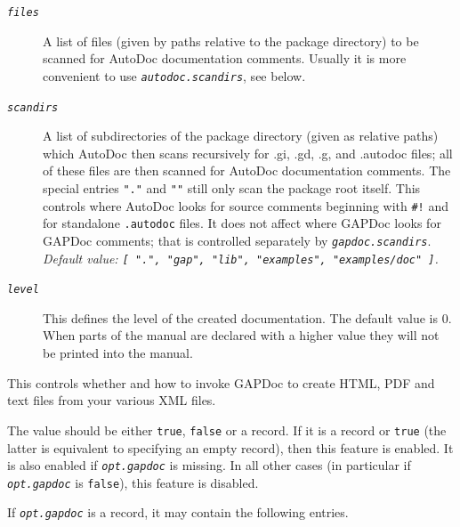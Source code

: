 \documentclass[a4paper,11pt]{report}
\begin{document}
{{{\begin{description}
\begin{description}
 
\begin{description}
\item[{\mbox{\texttt{\mdseries\slshape files}}}]  A list of files (given by paths relative to the package directory) to be
scanned for \textsf{AutoDoc} documentation comments. Usually it is more convenient to use \mbox{\texttt{\mdseries\slshape autodoc.scan{\textunderscore}dirs}}, see below. 
\item[{\mbox{\texttt{\mdseries\slshape scan{\textunderscore}dirs}}}]  A list of subdirectories of the package directory (given as relative paths)
which \textsf{AutoDoc} then scans recursively for .gi, .gd, .g, and .autodoc files; all of these
files are then scanned for \textsf{AutoDoc} documentation comments. The special entries \texttt{"."} and \texttt{""} still only scan the package root itself. This controls where \textsf{AutoDoc} looks for source comments beginning with \texttt{\#!} and for standalone \texttt{.autodoc} files. It does not affect where \textsf{GAPDoc} looks for GAPDoc comments; that is controlled separately by \mbox{\texttt{\mdseries\slshape gapdoc.scan{\textunderscore}dirs}}. \\
 \emph{Default value: \texttt{[ ".", "gap", "lib", "examples", "examples/doc" ]}.} 
\item[{\mbox{\texttt{\mdseries\slshape level}}}]  This defines the level of the created documentation. The default value is 0.
When parts of the manual are declared with a higher value they will not be
printed into the manual. 
\end{description}
 
\item[{\mbox{\texttt{\mdseries\slshape gapdoc}}}]  This controls whether and how to invoke \textsf{GAPDoc} to create HTML, PDF and text files from your various XML files. 

 The value should be either \texttt{true}, \texttt{false} or a record. If it is a record or \texttt{true} (the latter is equivalent to specifying an empty record), then this feature is
enabled. It is also enabled if \mbox{\texttt{\mdseries\slshape opt.gapdoc}} is missing. In all other cases (in particular if \mbox{\texttt{\mdseries\slshape opt.gapdoc}} is \texttt{false}), this feature is disabled. 

 

 If \mbox{\texttt{\mdseries\slshape opt.gapdoc}} is a record, it may contain the following entries. 


\end{description}
\end{description}}}}
\end{document}
